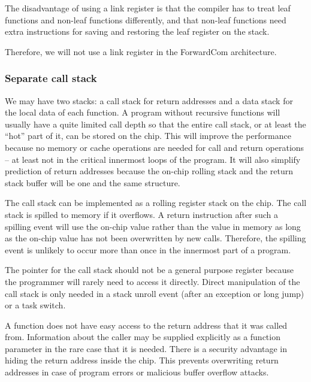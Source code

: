 \documentclass[forwardcom.tex]{subfiles}
\begin{document}
The disadvantage of using a link register is that the compiler has to treat leaf functions and non-leaf functions differently, and that non-leaf functions need extra instructions for saving and restoring the leaf register on the stack.
\vspace{2mm}

Therefore, we will not use a link register in the ForwardCom architecture.

\subsubsection{Separate call stack} \label{dualStack}
We may have two stacks: 
a call stack for return addresses and a data stack for the local data of each function. A program without recursive functions will usually have a quite limited call depth so that the entire call stack, or at least the ``hot'' part of it, can be stored on the chip. This will improve the performance because no memory or cache operations are needed for call and return operations -- at least not in the critical innermost loops of the program. It will also simplify prediction of return addresses because the on-chip rolling stack and the return stack buffer will be one and the same structure.
\vspace{2mm}

The call stack can be implemented as a rolling register stack on the chip. The call stack is spilled to memory if it overflows. A return instruction after such a spilling event will use the on-chip value rather than the value in memory as long as the on-chip value has not been overwritten by new calls. Therefore, the spilling event is unlikely to occur more than once in the innermost part of a program.
\vspace{2mm}

The pointer for the call stack should not be a general purpose register because the programmer will rarely need to access it directly. Direct manipulation of the call stack is only needed in a stack unroll event (after an exception or long jump) or a task switch.
\vspace{2mm}

A function does not have easy access to the return address that it was called from. Information about the caller may be supplied explicitly as a function parameter in the rare case that it is needed. There is a security advantage in hiding the return address inside the chip. This prevents overwriting return addresses in case of program errors or malicious buffer overflow attacks.
\vspace{2mm}
\end{document}
